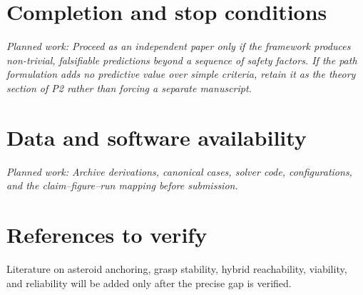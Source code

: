 \documentclass[11pt]{article}
\newcommand{\planned}[1]{\par\noindent\textit{Planned work: #1}\par}
\newif\ifBibliographyReady
\begin{document}
\section{Completion and stop conditions}
\planned{Proceed as an independent paper only if the framework produces
non-trivial, falsifiable predictions beyond a sequence of safety factors. If the
path formulation adds no predictive value over simple criteria, retain it as the
theory section of P2 rather than forcing a separate manuscript.}

\section*{Data and software availability}
\planned{Archive derivations, canonical cases, solver code, configurations, and
the claim--figure--run mapping before submission.}

\ifBibliographyReady
  
  
\else
  \section*{References to verify}
  Literature on asteroid anchoring, grasp stability, hybrid reachability,
  viability, and reliability will be added only after the precise gap is verified.
\fi
\end{document}
